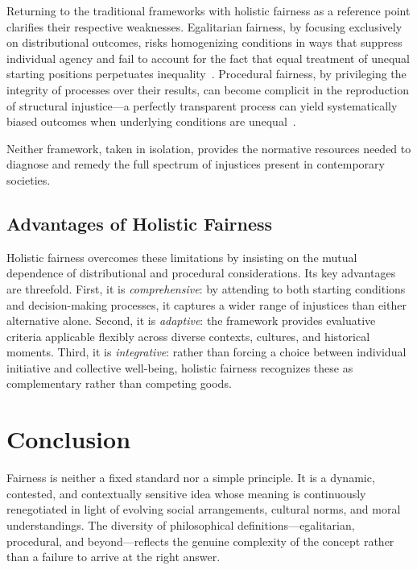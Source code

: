 \documentclass[11pt,showkeys]{../../shared/essay}
\begin{document}
Returning to the traditional frameworks with holistic fairness as a reference point clarifies
their respective weaknesses. Egalitarian fairness, by focusing exclusively on distributional
outcomes, risks homogenizing conditions in ways that suppress individual agency and fail to
account for the fact that equal treatment of unequal starting positions perpetuates
inequality~\cite{temkin2019}. Procedural fairness, by privileging the integrity of processes
over their results, can become complicit in the reproduction of structural injustice---a
perfectly transparent process can yield systematically biased outcomes when underlying
conditions are unequal~\cite{macdonald1980,galligan1997}.

Neither framework, taken in isolation, provides the normative resources needed to diagnose
and remedy the full spectrum of injustices present in contemporary societies.

\subsection{Advantages of Holistic Fairness}

Holistic fairness overcomes these limitations by insisting on the mutual dependence of
distributional and procedural considerations. Its key advantages are threefold. First, it is
\textit{comprehensive}: by attending to both starting conditions and decision-making
processes, it captures a wider range of injustices than either alternative alone. Second, it is
\textit{adaptive}: the framework provides evaluative criteria applicable flexibly across diverse
contexts, cultures, and historical moments. Third, it is \textit{integrative}: rather than
forcing a choice between individual initiative and collective well-being, holistic fairness
recognizes these as complementary rather than competing goods.

\section{Conclusion}

Fairness is neither a fixed standard nor a simple principle. It is a dynamic, contested, and
contextually sensitive idea whose meaning is continuously renegotiated in light of evolving
social arrangements, cultural norms, and moral understandings. The diversity of philosophical
definitions---egalitarian, procedural, and beyond---reflects the genuine complexity of the
concept rather than a failure to arrive at the right answer.
\end{document}
